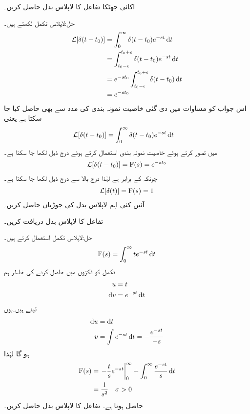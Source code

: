 اکائی جھٹکا تفاعل کا لاپلاس بدل حاصل کریں۔

حل:لاپلاس تکمل لکھتے ہیں۔
\begin{align*}
\Laplace[\delta(t-t_0)]&=\int_0^{\infty} \delta(t-t_0) e^{-st} \dif t\\
&=\int_{t_0-\epsilon}^{t_0+\epsilon} \delta(t-t_0) e^{-st} \dif t\\
&=e^{-s t_0} \int_{t_0-\epsilon}^{t_0+\epsilon} \delta(t-t_0) \dif t\\
&=e^{-st_0}
\end{align*}
اس جواب  کو مساوات  میں دی گئی خاصیت نمونہ بندی کی مدد سے بھی حاصل کیا جا سکتا ہے یعنی
  \begin{align*}
\Laplace[\delta(t-t_0)]&=\int_0^{\infty} \delta(t-t_0) e^{-st} \dif t
\end{align*}
میں  تصور کرتے ہوئے خاصیت نمونہ بندی استعمال کرتے  ہوئے درج ذیل لکھا جا سکتا ہے۔
\begin{align}
\mathcal{L}[\delta(t-t_0)]={{\textup{F}}}(s)=e^{-st_0}
\end{align}
چونکہ  کے برابر ہے لہٰذا درج بالا سے درج ذیل لکھا جا سکتا ہے۔
\begin{align}
\mathcal{L}[\delta(t)]={{\textup{F}}}(s)=1
\end{align}
آئیں کئی اہم لاپلاس بدل کی جوڑیاں حاصل کریں۔

تفاعل  کا لاپلاس بدل دریافت کریں۔

حل:لاپلاس تکمل استعمال کرتے ہیں۔
\begin{align*}
\bF(s)=\int_0^{\infty} t e^{-st} \dif t
\end{align*}
تکمل کو ٹکڑوں میں حاصل کرنے کی خاطر ہم 
\begin{align*}
u&=t\\
\dif v&=e^{-st} \dif t
\end{align*}
 لیتے ہیں۔یوں
\begin{align*}
\dif u &= \dif t\\
v&=\int e^{-st} \dif t=-\frac{e^{-st}}{-s}
\end{align*}
ہو گا لہٰذا
\begin{gather}
\begin{aligned}
\bF(s)&=\left. -\frac{t}{s}e^{-st}\right|_0^{\infty}+\int_0^{\infty} \frac{e^{-st}}{s} \dif t\\
&=\frac{1}{s^2} \quad \sigma>0
\end{aligned}
\end{gather}
حاصل ہوتا ہے۔
تفاعل  کا لاپلاس بدل حاصل کریں۔


